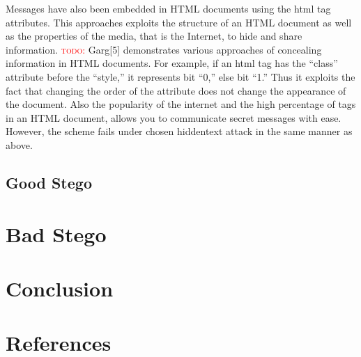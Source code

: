 \documentclass[11pt]{article}
\newcommand\todo[1]{\textcolor{red}{\textsc{todo}: #1}}
\begin{document}
Messages have also been embedded in HTML documents using the html tag
attributes. This approaches exploits the structure of an HTML document
as well as the properties of the media, that is the Internet, to hide
and share information. \todo{}Garg[5] demonstrates various approaches
of concealing information in HTML documents. For example, if an html
tag has the ``class'' attribute before the ``style,'' it represents
bit ``0,'' else bit ``1.'' Thus it exploits the fact that changing the
order of the attribute does not change the appearance of the document.
Also the popularity of the internet and the high percentage of tags in
an HTML document, allows you to communicate secret messages with ease.
However, the scheme fails under chosen hiddentext attack in the same
manner as above.




\subsection{Good Stego}

\section{Bad Stego}
\section{Conclusion}
\section{References}
\end{document}
